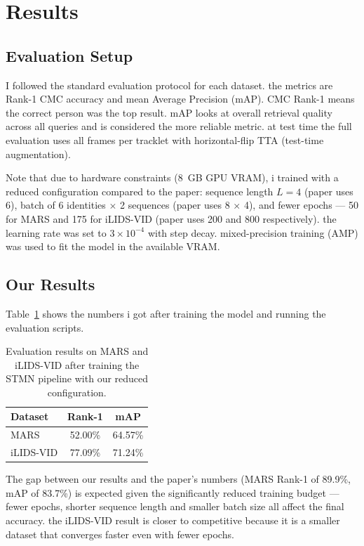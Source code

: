 \documentclass[conference]{IEEEtran}
\begin{document}
\section{Results}
\label{sec:results}

\subsection{Evaluation Setup}

I followed the standard evaluation protocol for each dataset. the metrics are Rank-1 CMC accuracy and mean Average Precision (mAP). CMC Rank-1 means the correct person was the top result. mAP looks at overall retrieval quality across all queries and is considered the more reliable metric. at test time the full evaluation uses all frames per tracklet with horizontal-flip TTA (test-time augmentation).

Note that due to hardware constraints (8~GB GPU VRAM), i trained with a reduced configuration compared to the paper: sequence length $L = 4$ (paper uses 6), batch of 6 identities $\times$ 2 sequences (paper uses 8 $\times$ 4), and fewer epochs --- 50 for MARS and 175 for iLIDS-VID (paper uses 200 and 800 respectively). the learning rate was set to $3 \times 10^{-4}$ with step decay. mixed-precision training (AMP) was used to fit the model in the available VRAM.

\subsection{Our Results}

Table~\ref{tab:results} shows the numbers i got after training the model and running the evaluation scripts.

\begin{table}[ht]
\centering
\caption{Evaluation results on MARS and iLIDS-VID after training the STMN pipeline with our reduced configuration.}
\renewcommand{\arraystretch}{1.3}
\begin{tabular}{@{}lcc@{}}
\toprule
\textbf{Dataset} & \textbf{Rank-1} & \textbf{mAP} \\
\midrule
MARS      & 52.00\% & 64.57\% \\
iLIDS-VID & 77.09\% & 71.24\% \\
\bottomrule
\end{tabular}
\label{tab:results}
\end{table}

The gap between our results and the paper's numbers (MARS Rank-1 of 89.9\%, mAP of 83.7\%) is expected given the significantly reduced training budget --- fewer epochs, shorter sequence length and smaller batch size all affect the final accuracy. the iLIDS-VID result is closer to competitive because it is a smaller dataset that converges faster even with fewer epochs.
\end{document}

